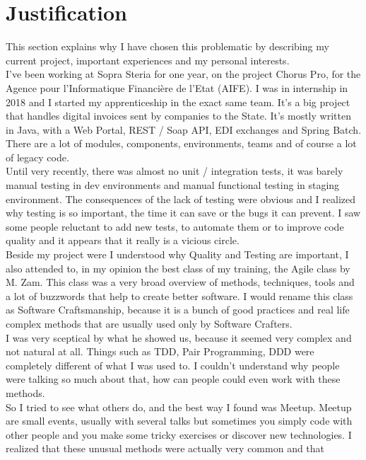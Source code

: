 \section{Justification}\label{sec:justification}
This section explains why I have chosen this problematic by describing
my current project, important experiences and my personal interests. \\
I've been working at Sopra Steria for one year, on the project
Chorus Pro, for the Agence pour l'Informatique Financi\`{e}re de l'Etat
(AIFE).
I was in internship in 2018 and I started my apprenticeship in the exact
same team.
It's a big project that handles digital invoices sent by companies to the
State.
It's mostly written in Java, with a Web Portal, REST / Soap API, EDI
exchanges and Spring Batch.
There are a lot of modules, components, environments, teams and of course
a lot of legacy code. \\
Until very recently, there was almost no unit / integration tests, it was
barely manual testing in dev environments and manual functional testing
in staging environment.
The consequences of the lack of testing were obvious and I realized why
testing is so important, the time it can save or the bugs it can prevent.
I saw some people reluctant to add new tests, to automate them or to
improve code quality and it appears that it really is a vicious circle.
\\
\newline
Beside my project were I understood why Quality and Testing are
important, I also attended to, in my opinion the best class of my
training, the Agile class by M. Zam.
This class was a very broad overview of methods, techniques, tools and a
lot of buzzwords that help to create better software.
I would rename this class as Software Craftsmanship, because it is a
bunch of good practices and real life complex methods that are usually
used only by Software Crafters. \\
I was very sceptical by what he showed us, because it seemed very complex
and not natural at all.
Things such as TDD, Pair Programming, DDD were completely different of
what I was used to.
I couldn't understand why people were talking so much about that, how can
people could even work with these methods. \\
So I tried to see what others do, and the best way I found was Meetup.
Meetup are small events, usually with several talks but sometimes you
simply code with other people and you make some tricky exercises or
discover new technologies.
I realized that these unusual methods were actually very common and that
